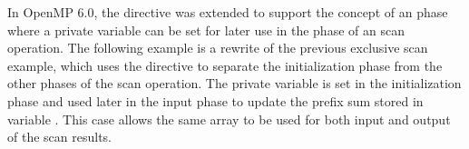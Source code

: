 

In OpenMP 6.0, the  directive was extended to support 
the concept of an  phase where a private variable 
can be set for later use in the  phase of
an  scan operation.
The following example is a rewrite of the previous exclusive scan
example, which uses the  directive to separate
the initialization phase from the other phases of the scan operation.
The private variable  is set in the initialization phase
and used later in the input phase to update the prefix sum stored
in variable .
This case allows the same array  to be used for
both input and output of the scan results.


